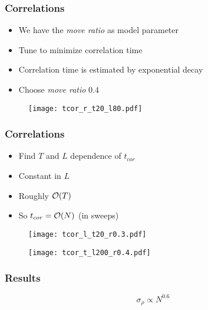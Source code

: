 \begin{frame}
    \frametitle{Correlations}
    \begin{itemize}
        \item We have the \emph{move ratio} as model parameter
        \item Tune to minimize correlation time
        \item Correlation time is estimated by exponential decay
        \item Choose \emph{move ratio} $0.4$
    \end{itemize}
    \begin{figure}[b]
        \centering
        \texttt{[image: tcor\_r\_t20\_l80.pdf]}
    \end{figure}   
\end{frame}

\begin{frame}
    \frametitle{Correlations}
    \begin{itemize}
        \item Find $T$ and $L$ dependence of $t_{cor}$
        \item Constant in $L$
        \item Roughly $\order{T}$ 
        \item So $t_{cor} = \order{N}$ (in sweeps)
    \end{itemize}
    \begin{figure}
        \centering
        \begin{minipage}{0.49\linewidth}
            \centering
            \texttt{[image: tcor\_l\_t20\_r0.3.pdf]}
        \end{minipage}
        \hfill
        \begin{minipage}{0.49\linewidth}
            \centering
            \texttt{[image: tcor\_t\_l200\_r0.4.pdf]}
        \end{minipage}
    \end{figure}
\end{frame}


\begin{frame}
    \frametitle{Results}
    \begin{equation*}
        \sigma_\rho \propto N^{0.6}   
    \end{equation*}

\end{frame}
